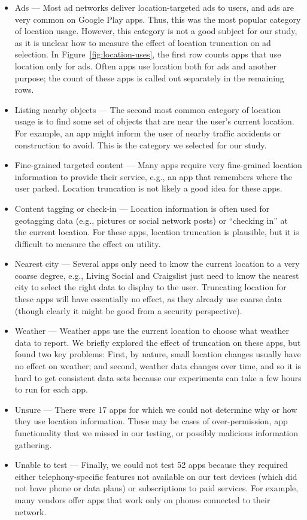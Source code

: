 \documentclass[10pt, conference, compsocconf]{IEEEtran}
\begin{document}
\begin{itemize}
\item Ads --- Most ad networks deliver location-targeted ads to
  users, and ads are very common on Google Play apps. Thus, this was
  the most popular category of location usage. However, this
  category is not a good subject for our study, as it is
  unclear how to measure the effect of location truncation on ad
  selection. In Figure~\ref{fig:location-uses}, the first row counts
  apps that use location only for ads. Often apps use location both
  for ads and another purpose; the count of these apps is called out
  separately in the remaining rows.
\item Listing nearby objects --- The second most common category of
  location usage is to find some set of objects that are near the
  user's current location. For example, an app might inform the user of
  nearby traffic accidents or construction to avoid. This is the
  category we selected for our study.
\item Fine-grained targeted content --- Many apps require
  very fine-grained location information to provide their service,
  e.g., an app that remembers where the user parked.
  Location truncation is not likely a good idea for these apps.
\item Content tagging or check-in --- Location information is often
  used for geotagging data (e.g., pictures
  or social network posts) or ``checking in'' at the current
  location. For these apps, location truncation is plausible, but
  it is difficult to measure the effect on utility.
\item Nearest city --- Several apps only need to know the current
  location to a very coarse degree, e.g., Living Social and
  Craigslist just need to know the nearest city to select the right
  data to display to the user. Truncating location for these apps
  will have essentially no effect, as they already use coarse data
  (though clearly it might be good from a security perspective).
\item Weather --- Weather apps use the current location to choose
  what weather data to report. We briefly explored the effect of
  truncation on these apps, but found two key problems: First, by
  nature, small
  location changes usually have no effect on weather; and second, weather data changes
  over time, and so it is hard to get consistent data sets because
  our experiments can take a few hours
  to run for each app.
\item Unsure --- There were 17 apps for which we could not determine
  why or how they use location information. These may be cases of
  over-permission, app functionality that we missed in our testing,
  or possibly malicious information gathering.
\item Unable to test --- Finally, we could not test 52 apps because
  they required either telephony-specific features not available on
  our test devices (which did not have phone or data plans) or
  subscriptions to paid services.  For example, many vendors offer
  apps that work only on phones connected to their network.
\end{itemize}
\end{document}
